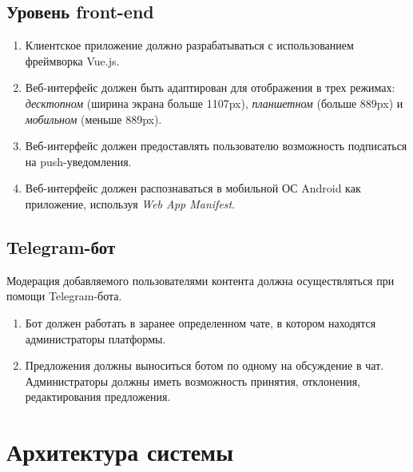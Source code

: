 \documentclass[12pt, a4paper]{article}
\begin{document}
\subsection{Уровень front-end}

\begin{enumerate}
\item Клиентское приложение должно разрабатываться с использованием фреймворка Vue.js.
\item Веб-интерфейс должен быть адаптирован для отображения в трех режимах:
\textit{десктопном} (ширина экрана больше 1107px),
\textit{планшетном} (больше 889px) и \textit{мобильном} (меньше 889px).
\item Веб-интерфейс должен предоставлять пользователю возможность подписаться на
push-уведомления.
\item Веб-интерфейс должен распознаваться в мобильной ОС Android как
приложение, используя \textit{Web App Manifest}.
\end{enumerate}

\subsection{Telegram-бот}
\label{telegram-bot}

Модерация добавляемого пользователями контента должна осуществляться
при помощи Telegram-бота.

\begin{enumerate}
\item Бот должен работать в заранее определенном чате, в котором находятся администраторы платформы.
\item Предложения должны выноситься ботом по одному на обсуждение в чат. Администраторы должны иметь возможность принятия, отклонения, редактирования предложения. 
\end{enumerate}

\section{Архитектура системы}
\end{document}
